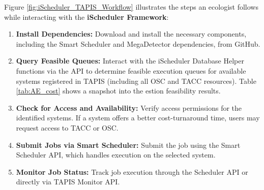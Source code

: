 Figure \ref{fig:iScheduler_TAPIS_Workflow} illustrates the steps an ecologist follows while interacting with the \textbf{iScheduler Framework}:

\begin{enumerate}
    \item \textbf{Install Dependencies:}  
    Download and install the necessary components, including the Smart Scheduler and MegaDetector dependencies, from GitHub.  
   
    \item \textbf{Query Feasible Queues:}  
    Interact with the iScheduler Database Helper functions via the API to determine feasible execution queues for available systems registered in TAPIS (including all OSC and TACC resources).  Table \ref{tab:AE_cost} shows a snapshot into the estion feasibility results. 

    \item \textbf{Check for Access and Availability:}  
    Verify access permissions for the identified systems. If a system offers a better cost-turnaround time, users may request access to TACC or OSC.  

    \item \textbf{Submit Jobs via Smart Scheduler:}  
    Submit the job using the Smart Scheduler API, which handles execution on the selected system.  

    \item \textbf{Monitor Job Status:}  
    Track job execution through the Scheduler API or directly via TAPIS Monitor API.  
\end{enumerate}

